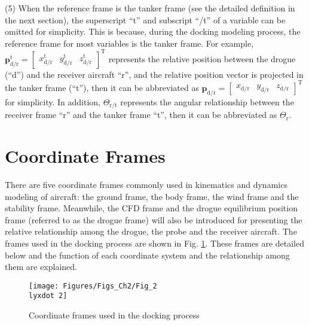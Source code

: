 (5) When the reference frame is the tanker frame (see the detailed
definition in the next section), the superscript ``t'' and subscript
``/t'' of a variable can be omitted for simplicity.
This is because, during the docking modeling process, the reference
frame for most variables is the tanker frame. For example, $\mathbf{p}_{\text{d/r}}^{\text{t}}={{[\begin{array}{ccc}
		x_{\text{d/r}}^{\text{t}} & y_{\text{d/r}}^{\text{t}} & z_{\text{d/r}}^{\text{t}}\end{array}]}^{\text{T}}}$ represents the relative position between the drogue (``d'') and
the receiver aircraft ``r'', and the relative position vector is
projected in the tanker frame (``t''), then it can be abbreviated
as ${{\mathbf{p}}_{\text{d/r}}}={{[\begin{array}{ccc}
		{{x}_{\text{d/r}}} & {{y}_{\text{d/r}}} & {{z}_{\text{d/r}}}\end{array}]}^{\text{T}}}$ for simplicity. In addition, ${{\Theta}_{\text{r}/\text{t}}}$ represents
the angular relationship between the receiver frame ``r'' and the
tanker frame ``t'', then it can be abbreviated as ${{\Theta}_{\text{r}}}$.

\section{Coordinate Frames}

There are five coordinate frames commonly used in kinematics and dynamics
modeling of aircraft: the ground frame, the body frame, the wind frame
and the stability frame. Meanwhile, the CFD frame and the drogue equilibrium
position frame (referred to as the drogue frame) will also be introduced
for presenting the relative relationship among the drogue, the probe
and the receiver aircraft. The frames used in the docking process
are shown in Fig. \ref{Fig_2.2}. These frames are detailed below
and the function of each coordinate system and the relationship among
them are explained.

\begin{figure}
	\begin{centering}
		\texttt{[image: Figures/Figs\_Ch2/Fig\_2\\lyxdot 2]}
		\par\end{centering}
	\caption{Coordinate frames used in the docking process}
	
	\centering{}\label{Fig_2.2}
\end{figure}



